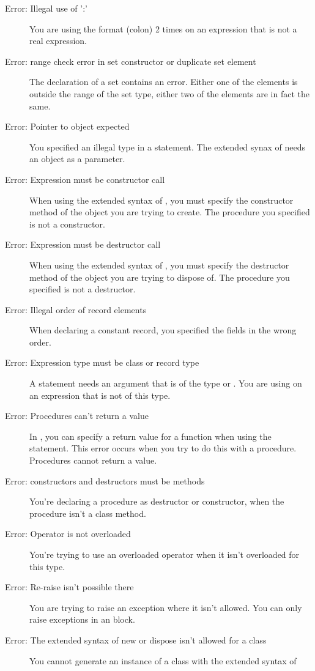 \begin{description}
\item [Error: Illegal use of ':']
 You are using the format \var{:} (colon) 2 times on an expression that
 is not a real expression.
\item [Error: range check error in set constructor or duplicate set element]
 The declaration of a set contains an error. Either one of the elements is
 outside the range of the set type, either two of the elements are in fact
 the same.
\item [Error: Pointer to object expected]
 You specified an illegal type in a  statement.
 The extended synax of  needs an  object as a parameter.
\item [Error: Expression must be constructor call]
 When using the extended syntax of , you must specify the constructor
 method of the object you are trying to create. The procedure you specified
 is not a constructor.
\item [Error: Expression must be destructor call]
 When using the extended syntax of , you must specify the
 destructor method of the object you are trying to dispose of.
 The procedure you specified is not a destructor.
\item [Error: Illegal order of record elements]
 When declaring a constant record, you specified the fields in the wrong
 order.
\item [Error: Expression type must be class or record type]
 A  statement needs an argument that is of the type 
 or . You are using  on an expression that is not of
 this type.
\item [Error: Procedures can't return a value]
 In \fpc, you can specify a return value for a function when using
 the  statement. This error occurs when you try to do this with a
 procedure. Procedures  cannot return a value.
\item [Error: constructors and destructors must be methods]
 You're declaring a procedure as destructor or constructor, when the
 procedure isn't a class method.
\item [Error: Operator is not overloaded]
 You're trying to use an overloaded operator when it isn't overloaded for
 this type.
\item [Error: Re-raise isn't possible there]
 You are trying to raise an exception where it isn't allowed. You can only
 raise exceptions in an  block.
\item [Error: The extended syntax of new or dispose isn't allowed for a class]
 You cannot generate an instance of a class with the extended syntax of

\end{description}
